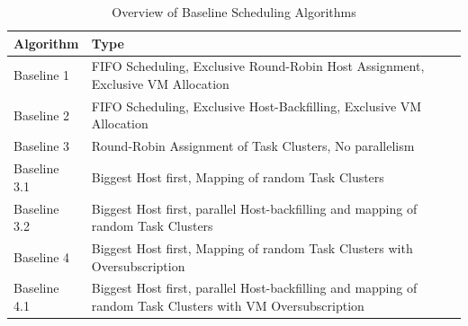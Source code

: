 \begin{table}[H]
    \centering
    \footnotesize
    \begin{tabularx}{\textwidth}{l p{10cm}}
        \toprule
        \textbf{Algorithm} & \textbf{Type}                                                                                              \\
        \midrule
        Baseline 1         & FIFO Scheduling, Exclusive Round-Robin Host Assignment, Exclusive VM Allocation                            \\
        Baseline 2         & FIFO Scheduling, Exclusive Host-Backfilling, Exclusive VM Allocation                                       \\
        Baseline 3         & Round-Robin Assignment of Task Clusters, No parallelism                                                    \\
        Baseline 3.1       & Biggest Host first, Mapping of random Task Clusters                                                        \\
        Baseline 3.2       & Biggest Host first, parallel Host-backfilling and mapping of random Task Clusters                          \\
        Baseline 4         & Biggest Host first, Mapping of random Task Clusters with Oversubscription                                  \\
        Baseline 4.1       & Biggest Host first, parallel Host-backfilling and mapping of random Task Clusters with VM Oversubscription \\
        \bottomrule
    \end{tabularx}
    \small
    \caption{Overview of Baseline Scheduling Algorithms}
    \label{tab:baselines_overview}
\end{table}

